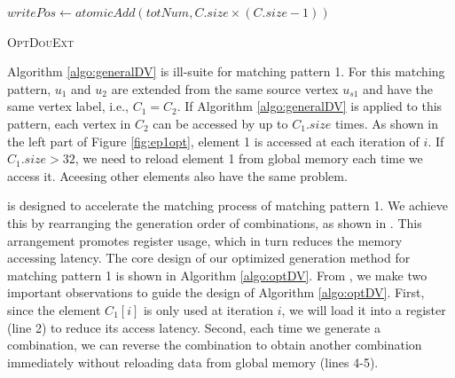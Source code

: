 \begin{algorithm}[t]
	$writePos \leftarrow atomicAdd(totNum,C.size \times (C.size-1))$\;
	\caption{\textsc{OptDouExt}}
	\label{algo:optDV}
\end{algorithm}
Algorithm \ref{algo:generalDV} is ill-suite for matching pattern 1. For this matching pattern, $u_1$ and $u_2$ are extended from the same
source vertex $u_{s1}$ and have the same vertex label, i.e., $C_1 = C_2$. If Algorithm \ref{algo:generalDV} is applied to this pattern,
each vertex in $C_2$ can be accessed by up to $C_1.size$ times. As shown in the left part of Figure \ref{fig:ep1opt}, element 1 is accessed
at each iteration of $i$. If $C_1.size>32$, we need to reload element 1 from global memory each time we access it. Aceesing other elements
also have the same problem.

\SystemName is designed to accelerate the matching process of matching pattern 1. We achieve this by rearranging the generation order of
combinations, as shown in . This arrangement promotes register usage, which in turn reduces the memory
accessing latency. The core design of our optimized generation method for matching pattern 1 is shown in Algorithm \ref{algo:optDV}. From
, we make two important observations to guide the design of Algorithm \ref{algo:optDV}. First, since the
element $C_1[i]$ is only used at iteration $i$, we will load it into a register (line 2) to reduce its access latency. Second, each time we
generate a combination, we can reverse the combination to obtain another combination immediately without reloading data from global memory
(lines 4-5).



